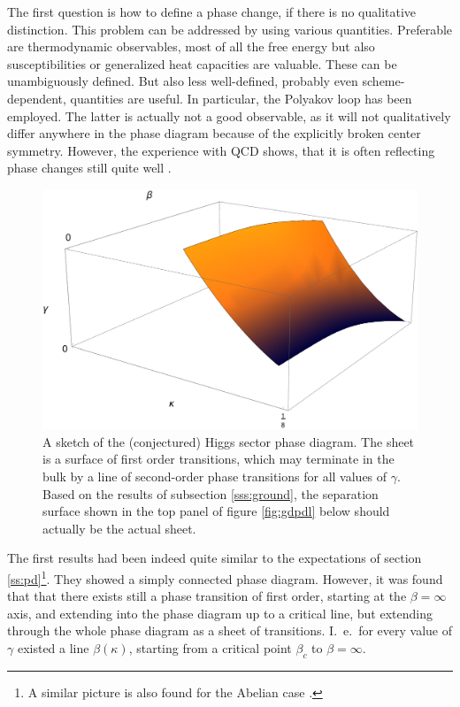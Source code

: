 \documentclass[final,12pt,3p,longtitle]{elsarticle}
\newcommand*{\1}{1\!\!\!\bot}
\begin{document}
The first question is how to define a phase change, if there is no qualitative distinction. This problem can be addressed by using various quantities. Preferable are thermodynamic observables, most of all the free energy but also susceptibilities or generalized heat capacities are valuable. These can be unambiguously defined. But also less well-defined, probably even scheme-dependent, quantities are useful. In particular, the Polyakov loop has been employed. The latter is actually not a good observable, as it will not qualitatively differ anywhere in the phase diagram because of the explicitly broken center symmetry. However, the experience with QCD shows, that it is often reflecting phase changes still quite well \cite{Gattringer:2010zz,Cossu:2007dk}.

\begin{figure}[!htbp]
\vspace*{-3cm}
\includegraphics[width=\linewidth]{pd-final}
\vspace*{-2.5cm}
\caption{\label{fig:pd}A sketch of the (conjectured) Higgs sector phase diagram. The sheet is a surface of first order transitions, which may terminate in the bulk by a line of second-order phase transitions for all values of $\gamma$. Based on the results of subsection \ref{sss:ground}, the separation surface shown in the top panel of figure \ref{fig:gdpdl} below should actually be the actual sheet.}
\end{figure}

The first results had been indeed quite similar \cite{Kuhnelt:1983mw,Gerdt:1984ft,Evertz:1985fc,Langguth:1985eu,Langguth:1985dr,Gerdt:1985rb,Evertz:1986vp} to the expectations of section \ref{ss:pd}\footnote{A similar picture is also found for the Abelian case \cite{Jansen:1985nh}.}. They showed a simply connected phase diagram. However, it was found that that there exists still a phase transition of first order, starting at the $\beta=\infty$ axis, and extending into the phase diagram up to a critical line, but extending through the whole phase diagram as a sheet of transitions. I.\ e.\ for every value of $\gamma$ existed a line $\beta(\kappa)$, starting from a critical point $\beta_c$ to $\beta=\infty$.
\end{document}

